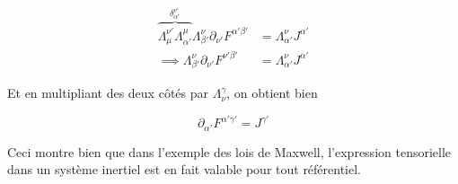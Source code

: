 \begin{align}
   \overbrace{\Lambda^{\nu '}_{\mu} \Lambda ^{\mu}_{\alpha'}}^{\displaystyle\delta^{\nu '}_{\alpha' }}\Lambda ^{\nu}_{\beta '} \partial_{\nu '} F^{\alpha ' \beta '} & =  \Lambda^{\nu }_{\alpha'}J^{\alpha '} \\
   \implies \Lambda ^{\nu}_{\beta '} \partial_{\nu '} F^{\nu ' \beta '}  &=  \Lambda^{\nu }_{\alpha'}J^{\alpha '}
\end{align}

Et en multipliant des deux côtés par $\displaystyle\Lambda^\gamma_\nu$, on obtient bien

\begin{equation}
    \partial_{\alpha '}F^{\alpha ' \gamma '} = J^{\gamma '}
\end{equation}

Ceci montre bien que dans l'exemple des lois de Maxwell, l'expression tensorielle dans un système inertiel est en fait valable pour tout référentiel.

